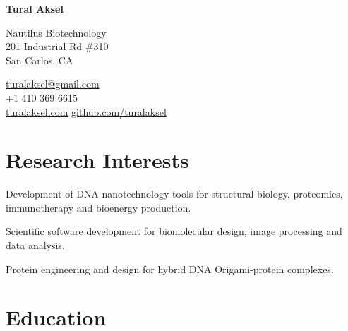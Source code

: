 \documentclass[12pt,letterpaper]{report}
\newcommand{\myname}{Tural Aksel}
\newcommand{\namefont}[1]{{\normalfont\bfseries\Huge{#1}}}
\newcommand{\listitemspace}{0.25em}
\renewenvironment{itemize}
{\begin{list}{}{\setlength{\leftmargin}{0em}
                \setlength{\parskip}{0em}
                \setlength{\itemsep}{\listitemspace}
                \setlength{\parsep}{\listitemspace}}}
{\end{list}}
\begin{document}
    \raggedright{}

    \namefont{\myname}

    \vspace{1em}
    \begin{minipage}[t]{0.700\textwidth}
        Nautilus Biotechnology \\
        201 Industrial Rd \#310 \\
        San Carlos, CA \\
    \end{minipage}
    \begin{minipage}[t]{0.295\textwidth}
        \flushright{}
        \href{mailto:turalaksel@ngmail.com}{turalaksel@gmail.com} \\
        +1 410 369 6615 \\
        \href{https://www.linkedin.com/in/turalaksel}{turalaksel.com}
        \href{https://github.com/turalaksel}{github.com/turalaksel}
    \end{minipage}

    \section*{Research Interests}

    \begin{itemize}

        \item \textbullet \hspace{0.2cm} Development of DNA nanotechnology tools for structural biology, proteomics, immunotherapy and bioenergy production. 
        \item \textbullet \hspace{0.2cm} Scientific software development for biomolecular design, image processing and data analysis.
        \item \textbullet \hspace{0.2cm} Protein engineering and design for hybrid DNA Origami-protein complexes.

    \end{itemize}

    \section*{Education}
\end{document}
